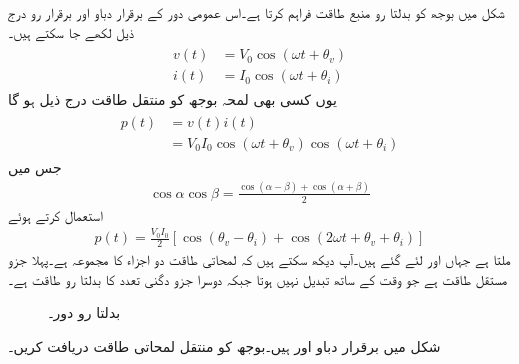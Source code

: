 
شکل  میں بوجھ  کو بدلتا رو منبع  طاقت فراہم کرتا ہے۔اس عمومی دور کے برقرار دباو اور برقرار رو درج ذیل لکھے جا سکتے ہیں۔
\begin{gather}
\begin{aligned}\label{مساوات_طاقت_دباو_رو_عمومی_الف}
v(t)&=V_0\cos(\omega t +\theta_v)\\
i(t)&=I_0\cos(\omega t +\theta_i)
\end{aligned}
\end{gather}
یوں کسی بھی لمحہ بوجھ کو منتقل طاقت درج ذیل ہو گا
\begin{gather}
\begin{aligned}
p(t)&=v(t)i(t)\\
&=V_0 I_0  \cos(\omega t +\theta_v) \cos(\omega t +\theta_i)
\end{aligned}
\end{gather}
جس میں
\begin{align}
\cos \alpha \cos \beta=\frac{\cos(\alpha-\beta)+\cos(\alpha+\beta)}{2}
\end{align}
استعمال کرتے ہوئے
\begin{align}\label{مساوات_طاقت_لمحاتی_طاقت_الف}
p(t)=\frac{V_0 I_0}{2}\left[\cos(\theta_v-\theta_i)+\cos(2\omega t +\theta_v+\theta_i)\right]
\end{align}
ملتا ہے جہاں  اور  لئے گئے ہیں۔آپ دیکھ سکتے ہیں کہ لمحاتی طاقت دو اجزاء کا مجموعہ ہے۔پہلا جزو مستقل طاقت ہے جو وقت کے ساتھ تبدیل نہیں ہوتا جبکہ دوسرا جزو دگنی تعدد کا بدلتا رو طاقت ہے۔  
%
\begin{figure}
\centering
{}
\caption{بدلتا رو دور۔}
\label{شکل_طاقت_پرزے_کو_منتقل}
\end{figure}
شکل  میں برقرار دباو  اور  ہیں۔بوجھ کو منتقل لمحاتی طاقت دریافت کریں۔

